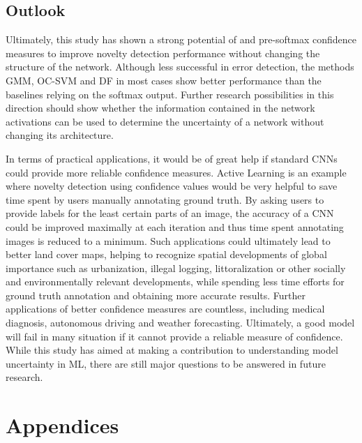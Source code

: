 \documentclass[10pt]{article}
\begin{document}
\subsection{Outlook}
\label{subsec:outlook}

Ultimately, this study has shown a strong potential of  and pre-softmax confidence measures to improve novelty detection performance without changing the structure of the network. Although less successful in error detection, the methods \gls{GMM}, \gls{OC-SVM} and \gls{DF} in most cases show better performance than the baselines relying on the softmax output. Further research possibilities in this direction should show whether the information contained in the network activations can be used to determine the uncertainty of a network without changing its architecture.

In terms of practical applications, it would be of great help if standard \glspl{CNN} could provide more reliable confidence measures. Active Learning is an example where novelty detection using confidence values would be very helpful to save time spent by users manually annotating ground truth. By asking users to provide labels for the least certain parts of an image, the accuracy of a \gls{CNN} could be improved maximally at each iteration and thus time spent annotating images is reduced to a minimum. Such applications could ultimately lead to better land cover maps, helping to recognize spatial developments of global importance such as urbanization, illegal logging, littoralization or other socially and environmentally relevant developments, while spending less time efforts for ground truth annotation and obtaining more accurate results. Further applications of better confidence measures are countless, including medical diagnosis, autonomous driving and weather forecasting. Ultimately, a good model will fail in many situation if it cannot provide a reliable measure of confidence. While this study has aimed at making a contribution to understanding model uncertainty in \gls{ML}, there are still major questions to be answered in future research.

\newpage
\printbibliography

\newpage
\renewcommand{\thesubsection}{\Alph{subsection}}
\pagebreak  

\section{Appendices}
\end{document}
